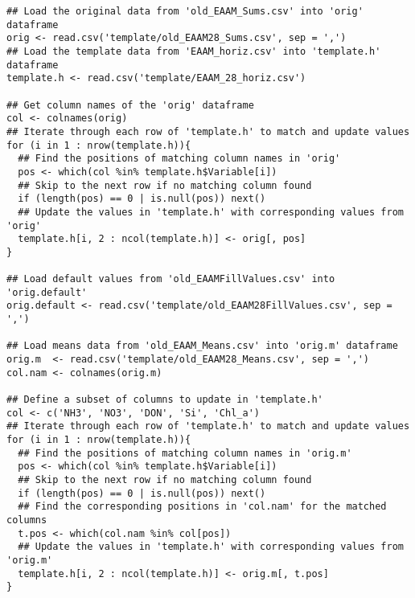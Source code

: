 \documentclass[a4paper]{article}
\begin{document}
\begin{verbatim}
## Load the original data from 'old_EAAM_Sums.csv' into 'orig' dataframe
orig <- read.csv('template/old_EAAM28_Sums.csv', sep = ',')
## Load the template data from 'EAAM_horiz.csv' into 'template.h' dataframe
template.h <- read.csv('template/EAAM_28_horiz.csv')

## Get column names of the 'orig' dataframe
col <- colnames(orig)
## Iterate through each row of 'template.h' to match and update values
for (i in 1 : nrow(template.h)){
  ## Find the positions of matching column names in 'orig'
  pos <- which(col %in% template.h$Variable[i])
  ## Skip to the next row if no matching column found
  if (length(pos) == 0 | is.null(pos)) next()
  ## Update the values in 'template.h' with corresponding values from 'orig'
  template.h[i, 2 : ncol(template.h)] <- orig[, pos]
}

## Load default values from 'old_EAAMFillValues.csv' into 'orig.default'
orig.default <- read.csv('template/old_EAAM28FillValues.csv', sep = ',')

## Load means data from 'old_EAAM_Means.csv' into 'orig.m' dataframe
orig.m  <- read.csv('template/old_EAAM28_Means.csv', sep = ',')
col.nam <- colnames(orig.m)

## Define a subset of columns to update in 'template.h'
col <- c('NH3', 'NO3', 'DON', 'Si', 'Chl_a')
## Iterate through each row of 'template.h' to match and update values
for (i in 1 : nrow(template.h)){
  ## Find the positions of matching column names in 'orig.m'
  pos <- which(col %in% template.h$Variable[i])
  ## Skip to the next row if no matching column found
  if (length(pos) == 0 | is.null(pos)) next()
  ## Find the corresponding positions in 'col.nam' for the matched columns
  t.pos <- which(col.nam %in% col[pos])
  ## Update the values in 'template.h' with corresponding values from 'orig.m'
  template.h[i, 2 : ncol(template.h)] <- orig.m[, t.pos]
}


\end{verbatim}
\end{document}
